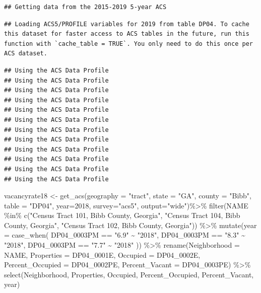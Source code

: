 \documentclass[
]{article}
\newenvironment{Shaded}{\begin{snugshade}}{\end{snugshade}}
\newcommand{\AttributeTok}[1]{\textcolor[rgb]{0.77,0.63,0.00}{#1}}
\newcommand{\DecValTok}[1]{\textcolor[rgb]{0.00,0.00,0.81}{#1}}
\newcommand{\FunctionTok}[1]{\textcolor[rgb]{0.00,0.00,0.00}{#1}}
\newcommand{\NormalTok}[1]{#1}
\newcommand{\OtherTok}[1]{\textcolor[rgb]{0.56,0.35,0.01}{#1}}
\newcommand{\SpecialCharTok}[1]{\textcolor[rgb]{0.00,0.00,0.00}{#1}}
\newcommand{\StringTok}[1]{\textcolor[rgb]{0.31,0.60,0.02}{#1}}
\begin{document}
\begin{verbatim}
## Getting data from the 2015-2019 5-year ACS
\end{verbatim}

\begin{verbatim}
## Loading ACS5/PROFILE variables for 2019 from table DP04. To cache this dataset for faster access to ACS tables in the future, run this function with `cache_table = TRUE`. You only need to do this once per ACS dataset.
\end{verbatim}

\begin{verbatim}
## Using the ACS Data Profile
## Using the ACS Data Profile
## Using the ACS Data Profile
## Using the ACS Data Profile
## Using the ACS Data Profile
## Using the ACS Data Profile
## Using the ACS Data Profile
## Using the ACS Data Profile
## Using the ACS Data Profile
## Using the ACS Data Profile
## Using the ACS Data Profile
## Using the ACS Data Profile
\end{verbatim}

\begin{Shaded}
\begin{Highlighting}[]
\NormalTok{vacancyrate18 }\OtherTok{\textless{}{-}} \FunctionTok{get\_acs}\NormalTok{(}\AttributeTok{geography =} \StringTok{"tract"}\NormalTok{, }\AttributeTok{state =} \StringTok{"GA"}\NormalTok{, }\AttributeTok{county =} \StringTok{"Bibb"}\NormalTok{, }\AttributeTok{table =} \StringTok{"DP04"}\NormalTok{,  }\AttributeTok{year=}\DecValTok{2018}\NormalTok{, }\AttributeTok{survey=}\StringTok{"acs5"}\NormalTok{, }\AttributeTok{output=}\StringTok{"wide"}\NormalTok{)}\SpecialCharTok{\%\textgreater{}\%}
\FunctionTok{filter}\NormalTok{(NAME }\SpecialCharTok{\%in\%} \FunctionTok{c}\NormalTok{(}\StringTok{"Census Tract 101, Bibb County, Georgia"}\NormalTok{, }\StringTok{"Census Tract 104, Bibb County, Georgia"}\NormalTok{, }\StringTok{"Census Tract 102, Bibb County, Georgia"}\NormalTok{)) }\SpecialCharTok{\%\textgreater{}\%}
  \FunctionTok{mutate}\NormalTok{(}\AttributeTok{year =} \FunctionTok{case\_when}\NormalTok{(}
\NormalTok{    DP04\_0003PM }\SpecialCharTok{==} \StringTok{"6.9"} \SpecialCharTok{\textasciitilde{}} \StringTok{"2018"}\NormalTok{,}
\NormalTok{    DP04\_0003PM }\SpecialCharTok{==} \StringTok{"8.3"} \SpecialCharTok{\textasciitilde{}} \StringTok{"2018"}\NormalTok{,}
\NormalTok{    DP04\_0003PM }\SpecialCharTok{==} \StringTok{"7.7"} \SpecialCharTok{\textasciitilde{}} \StringTok{"2018"}
\NormalTok{  )) }\SpecialCharTok{\%\textgreater{}\%}
  \FunctionTok{rename}\NormalTok{(}\AttributeTok{Neighborhood =}\NormalTok{ NAME,}
         \AttributeTok{Properties =}\NormalTok{ DP04\_0001E,}
         \AttributeTok{Occupied =}\NormalTok{ DP04\_0002E,}
         \AttributeTok{Percent\_Occupied =}\NormalTok{ DP04\_0002PE,}
         \AttributeTok{Percent\_Vacant =}\NormalTok{ DP04\_0003PE) }\SpecialCharTok{\%\textgreater{}\%}
   \FunctionTok{select}\NormalTok{(Neighborhood, Properties, Occupied, Percent\_Occupied, Percent\_Vacant, year) }
\end{Highlighting}
\end{Shaded}
\end{document}
